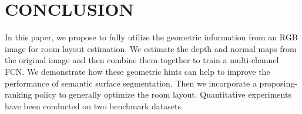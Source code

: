 \section{CONCLUSION}
\label{sec:Con}

In this paper, we propose to fully utilize the geometric information from an RGB image for room layout estimation. We estimate the depth and normal maps from the original image and then combine them together to train a multi-channel FCN. We demonstrate how these geometric hints can help to improve the performance of semantic surface segmentation. Then we incorporate a proposing-ranking policy to generally optimize the room layout. Quantitative experiments have been conducted on two benchmark datasets.